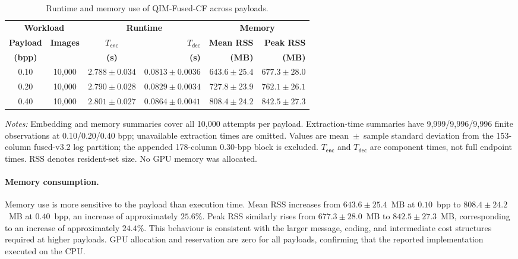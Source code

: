 \documentclass[journal]{IEEEtran}
\renewcommand{\arraystretch}{1.2}
\renewcommand{\arraystretch}{1.0}
\theoremstyle{definition}
\theoremstyle{game}
\renewcommand{\arraystretch}{1.5}
\begin{document}
\begin{table}[!t]
\centering
\caption[Runtime and memory use across payloads.]
{Runtime and memory use of QIM-Fused-CF across payloads.}
\label{tab:qim_v32_runtime}
\small
\setlength{\tabcolsep}{6pt}
\renewcommand{\arraystretch}{1.15}
\begin{threeparttable}
\begin{tabular}{@{}cccrrr@{}}
\toprule
\multicolumn{2}{c}{\textbf{Workload}} &
\multicolumn{2}{c}{\textbf{Runtime}} &
\multicolumn{2}{c}{\textbf{Memory}} \\
\cmidrule(lr){1-2}
\cmidrule(lr){3-4}
\cmidrule(l){5-6}
\textbf{Payload} &
\textbf{Images} &
\boldmath$T_{\mathsf{enc}}$ &
\boldmath$T_{\mathsf{dec}}$ &
\textbf{Mean RSS} &
\textbf{Peak RSS} \\
\textbf{(bpp)} &
{} &
\textbf{(s)} &
\textbf{(s)} &
\textbf{(MB)} &
\textbf{(MB)} \\
\midrule
0.10 & 10,000 & $2.788 \pm 0.034$ & $0.0813 \pm 0.0036$ & $643.6 \pm 25.4$ & $677.3 \pm 28.0$ \\
0.20 & 10,000 & $2.790 \pm 0.028$ & $0.0829 \pm 0.0034$ & $727.8 \pm 23.9$ & $762.1 \pm 26.1$ \\
0.40 & 10,000 & $2.801 \pm 0.027$ & $0.0864 \pm 0.0041$ & $808.4 \pm 24.2$ & $842.5 \pm 27.3$ \\
\bottomrule
\end{tabular}
\begin{tablenotes}
\footnotesize
\item \textit{Notes:} Embedding and memory summaries cover all 10,000 attempts per payload.
Extraction-time summaries have 9,999/9,996/9,996 finite observations at
0.10/0.20/0.40 bpp; unavailable extraction times are omitted. Values are
mean~$\pm$~sample standard deviation from the 153-column fused-v3.2
log partition; the appended 178-column 0.30-bpp block is excluded.
$T_{\mathsf{enc}}$ and $T_{\mathsf{dec}}$ are component times, not full
endpoint times. RSS denotes resident-set size. No GPU memory was allocated.
\end{tablenotes}
\end{threeparttable}
\end{table}

\paragraph{Memory consumption.}
Memory use is more sensitive to the payload than execution time.
Mean RSS increases from $643.6\pm25.4$~MB at $0.10$~bpp to
$808.4\pm24.2$~MB at $0.40$~bpp, an increase of approximately
$25.6\%$. Peak RSS similarly rises from
$677.3\pm28.0$~MB to $842.5\pm27.3$~MB, corresponding to an
increase of approximately $24.4\%$. This behaviour is consistent
with the larger message, coding, and intermediate cost structures
required at higher payloads. GPU allocation and reservation are
zero for all payloads, confirming that the reported implementation
executed on the CPU.
\end{document}
